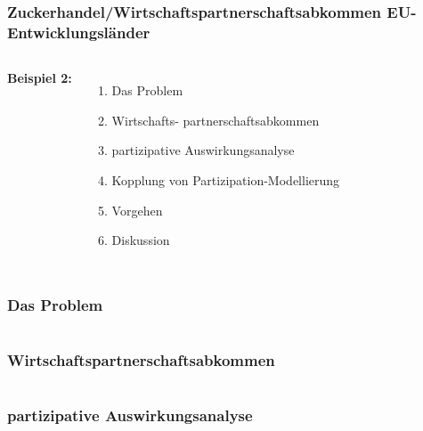 \documentclass{beamer}
\begin{document}

\begin{frame}
\frametitle{Zuckerhandel/Wirtschaftspartnerschaftsabkommen EU-Entwicklungsländer}
\begin{columns}[c] %

\textbf{Beispiel 2:}
\begin{enumerate}
\item Das Problem
\item Wirtschafts- partnerschaftsabkommen
\item partizipative Auswirkungsanalyse
\item Kopplung von Partizipation-Modellierung
\item Vorgehen
\item Diskussion
\end{enumerate}

\end{columns}
\end{frame}


\begin{frame}
\frametitle{Das Problem}
\begin{columns}[c] %



\end{columns}
\end{frame}


\begin{frame}
\frametitle{Wirtschaftspartnerschaftsabkommen}
\begin{columns}[c] %



\end{columns}
\end{frame}

\begin{frame}
\frametitle{partizipative Auswirkungsanalyse}
\begin{columns}[c] %



\end{columns}
\end{frame}
\end{document}
